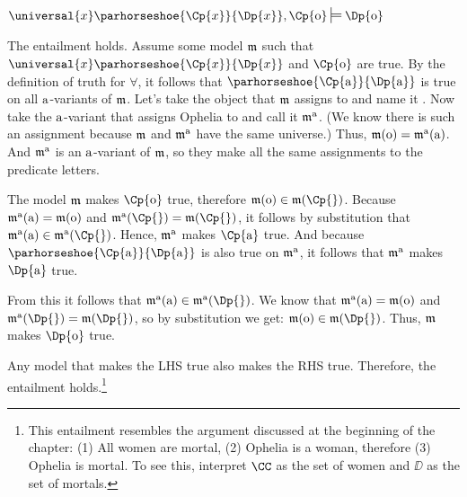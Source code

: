 \begin{majorILnc}{}
	$\universal{\variable{x}}\parhorseshoe{\Cp{\variable{x}}}{\Dp{\variable{x}}}, \Cp{\constant{o}}\sdtstile{}{}\Dp{\constant{o}}$
\end{majorILnc}
\begin{PROOF}
	The entailment holds.  Assume some model $\mathfrak{m}$ such that $\universal{\variable{x}}\parhorseshoe{\Cp{\variable{x}}}{\Dp{\variable{x}}}$ and $\Cp{\constant{o}}$ are true.  By the definition of truth for $\forall$, it follows that $\parhorseshoe{\Cp{\constant{a}}}{\Dp{\constant{a}}}$ is true on all $\mathrm{a}$-variants of $\mathfrak{m}$.  Let's take the object that $\mathfrak{m}$ assigns to  and name it .  Now take the $\mathrm{a}$-variant that assigns Ophelia to  and call it $\mathfrak{m^{\mathrm{\mathrm{a}}}_{\mathrm{}}}$.  (We know there is such an assignment because $\mathfrak{m}$ and $\mathfrak{m^{\mathrm{\mathrm{a}}}_{\mathrm{}}}$ have the same universe.)  Thus, $\mathfrak{m}(\mathrm{o})=\mathfrak{m^{\mathrm{\mathrm{a}}}_{\mathrm{}}}(\mathrm{a})$.  And $\mathfrak{m^{\mathrm{\mathrm{a}}}_{\mathrm{}}}$ is an $\mathrm{a}$-variant of $\mathfrak{m}$, so they make all the same assignments to the predicate letters.
	
	The model $\mathfrak{m}$ makes $\Cp{\constant{o}}$ true, therefore $\IntA(\constant{o})\in\IntA(\Cp{})$.  Because $\mathfrak{m^{\mathrm{\mathrm{a}}}_{\mathrm{}}}(\mathrm{a})=\mathfrak{m}(\mathrm{o})$ and $\As{\constant{a}}{}(\Cp{})=\IntA(\Cp{})$, it follows by substitution that $\As{\constant{a}}{}(\constant{a})\in\As{\constant{a}}{}(\Cp{})$.  Hence, $\mathfrak{m^{\mathrm{\mathrm{a}}}_{\mathrm{}}}$ makes $\Cp{\constant{a}}$ true.  And because $\parhorseshoe{\Cp{\constant{a}}}{\Dp{\constant{a}}}$ is also true on $\mathfrak{m^{\mathrm{\mathrm{a}}}_{\mathrm{}}}$, it follows that $\mathfrak{m^{\mathrm{\mathrm{a}}}_{\mathrm{}}}$ makes $\Dp{\constant{a}}$ true.
	
	From this it follows that $\As{\constant{a}}{}(\constant{a})\in\As{\constant{a}}{}(\Dp{})$.  We know that $\mathfrak{m^{\mathrm{\mathrm{a}}}_{\mathrm{}}}(\mathrm{a})=\mathfrak{m}(\mathrm{o})$ and $\As{\constant{a}}{}(\Dp{})=\IntA(\Dp{})$, so by substitution we get: $\IntA(\constant{o})\in\IntA(\Dp{})$.  Thus, $\mathfrak{m}$ makes $\Dp{\constant{o}}$ true.
	
	Any model that makes the LHS true also makes the RHS true.  Therefore, the entailment holds.\footnote{This entailment resembles the argument discussed at the beginning of the chapter: (1) All women are mortal, (2) Ophelia is a woman, therefore (3) Ophelia is mortal.  To see this, interpret $\CC$ as the set of women and $\DD$ as the set of mortals.}
\end{PROOF}	


